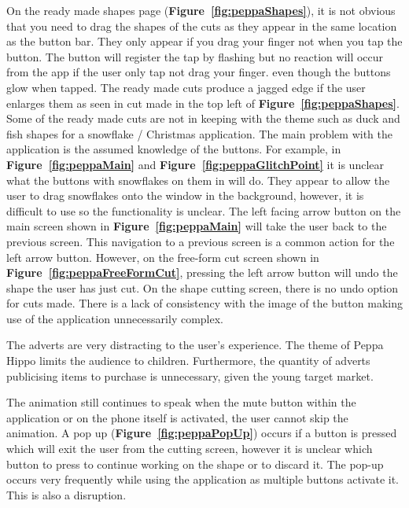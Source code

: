 \documentclass[11pt]{article}
\begin{document}
                    On the ready made shapes page (\textbf{Figure~\ref{fig:peppaShapes}}), it is not obvious that you need to drag the shapes of the cuts as they appear in the same location as the button bar. They only appear if you drag your finger not when you tap the button. The button will register the tap by flashing but no reaction will occur from the app if the user only tap not drag your finger.  even though the buttons glow when tapped. The ready made cuts produce a jagged edge if the user enlarges them as seen in cut made in the top left of \textbf{Figure~\ref{fig:peppaShapes}}. Some of the ready made cuts are not in keeping with the theme such as duck and fish shapes for a snowflake / Christmas application. 
                    The main problem with the application is the assumed knowledge of the buttons. For example, in \textbf{Figure~\ref{fig:peppaMain}} and \textbf{Figure~\ref{fig:peppaGlitchPoint}} it is unclear what the buttons with snowflakes on them in will do. They appear to allow the user to drag snowflakes onto the window in the background, however, it is difficult to use so the functionality is unclear. The left facing arrow button on the main screen shown in \textbf{Figure~\ref{fig:peppaMain}} will take the user back to the previous screen. This navigation to a previous screen is a common action for the left arrow button. However, on the free-form cut screen shown in \textbf{Figure~\ref{fig:peppaFreeFormCut}}, pressing the left arrow button will undo the shape the user has just cut.
                 On the shape cutting screen, there is no undo option for cuts made. There is a lack of consistency with the image of the button making use of the application unnecessarily complex.
                
                The adverts are very distracting to the user's experience. The theme of Peppa Hippo limits the audience to children. Furthermore, the quantity of adverts publicising items to purchase is unnecessary, given the young target market.

                
                
                The animation still continues to speak when the mute button within the application or on the phone itself is activated, the user cannot skip the animation. A pop up (\textbf{Figure~\ref{fig:peppaPopUp}}) occurs if a button is pressed which will exit the user from the cutting screen, however it is unclear which button to press to continue working on the shape or to discard it. The pop-up occurs very frequently while using the application as multiple buttons activate it. This is also a disruption. 
                
\end{document}
